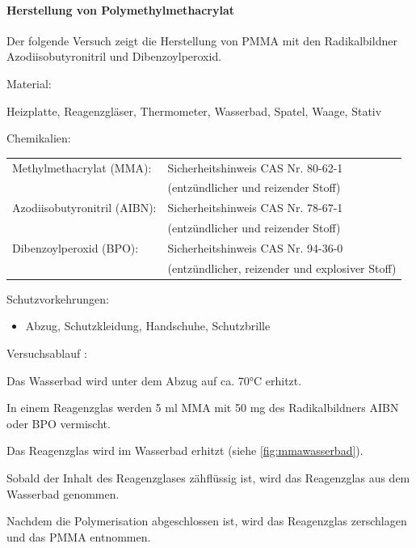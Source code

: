 \paragraph{Herstellung von Polymethylmethacrylat}

Der folgende Versuch zeigt die Herstellung von PMMA mit den Radikalbildner
Azodiisobutyronitril und Dibenzoylperoxid.

\begin{itemize}
\end{itemize}

Material:
\begin{itemize*}
    \item Heizplatte, Reagenzgläser, Thermometer, Wasserbad, Spatel, Waage, Stativ
    \item Chemikalien: \\
    \begin{xtabular}{ll}
    Methylmethacrylat (MMA): & Sicherheitshinweis CAS Nr. 80-62-1 \\
    & (entzündlicher und reizender Stoff) \\
    Azodiisobutyronitril (AIBN): & Sicherheitshinweis CAS Nr. 78-67-1 \\
    & (entzündlicher und reizender Stoff) \\
    Dibenzoylperoxid (BPO): & Sicherheitshinweis CAS Nr. 94-36-0 \\
    & (entzündlicher, reizender und explosiver Stoff)
    \end{xtabular}
\end{itemize*}

Schutzvorkehrungen:
\begin{itemize}
    \item Abzug, Schutzkleidung, Handschuhe, Schutzbrille
\end{itemize}

Versuchsablauf \cite{pofversuch}:
\begin{enumerate*}
    \item Das Wasserbad wird unter dem Abzug auf ca. 70°C erhitzt.
    \item In einem Reagenzglas werden 5 ml MMA mit 50 mg des Radikalbildners AIBN oder BPO vermischt.
    \item Das Reagenzglas wird im Wasserbad erhitzt (siehe \autoref{fig:mmawasserbad}).
    \item Sobald der Inhalt des Reagenzglases zähflüssig ist, wird das Reagenzglas aus dem Wasserbad genommen.
    \item Nachdem die Polymerisation abgeschlossen ist, wird das Reagenzglas zerschlagen und das PMMA entnommen.
\end{enumerate*}

